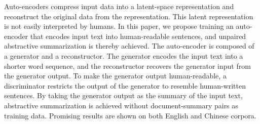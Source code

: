 Auto-encoders compress input data into a latent-space representation and reconstruct the original data from the representation. This latent representation is not easily interpreted by humans. In this paper, we propose training an auto-encoder that encodes input text into human-readable sentences, and unpaired abstractive summarization is thereby achieved. The auto-encoder is composed of a generator and a reconstructor. The generator encodes the input text into a shorter word sequence, and the reconstructor recovers the generator input from the generator output. To make the generator output human-readable, a discriminator restricts the output of the generator to resemble human-written sentences. By taking the generator output as the summary of the input text, abstractive summarization is achieved without document-summary pairs as training data. Promising results are shown on both English and Chinese corpora.
